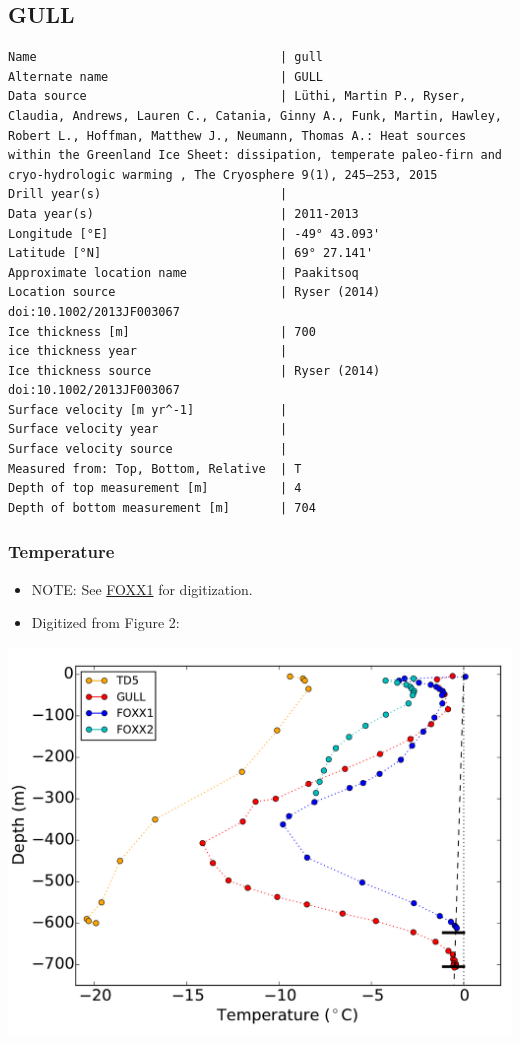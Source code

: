 \documentclass[article,a4paper,times,11pt,twoside]{article}
\begin{document}
\subsection{GULL}
\label{sec:org8818506}
\begin{verbatim}
Name                                  | gull
Alternate name                        | GULL
Data source                           | Lüthi, Martin P., Ryser, Claudia, Andrews, Lauren C., Catania, Ginny A., Funk, Martin, Hawley, Robert L., Hoffman, Matthew J., Neumann, Thomas A.: Heat sources within the Greenland Ice Sheet: dissipation, temperate paleo-firn and cryo-hydrologic warming , The Cryosphere 9(1), 245–253, 2015 
Drill year(s)                         | 
Data year(s)                          | 2011-2013
Longitude [°E]                        | -49° 43.093'
Latitude [°N]                         | 69° 27.141'
Approximate location name             | Paakitsoq
Location source                       | Ryser (2014) doi:10.1002/2013JF003067
Ice thickness [m]                     | 700
ice thickness year                    | 
Ice thickness source                  | Ryser (2014) doi:10.1002/2013JF003067
Surface velocity [m yr^-1]            | 
Surface velocity year                 | 
Surface velocity source               | 
Measured from: Top, Bottom, Relative  | T
Depth of top measurement [m]          | 4
Depth of bottom measurement [m]       | 704
\end{verbatim}

\subsubsection{Temperature}
\label{sec:orgde7d063}

\begin{itemize}
\item NOTE: See \href{gull/foxx1/README.org}{FOXX1} for digitization.
\item Digitized from \textcite{luthi_2015} Figure 2:
\end{itemize}

\begin{center}
\includegraphics[width=.9\linewidth]{gull/luthi_2015_fig2_all.png}
\end{center}
\end{document}

